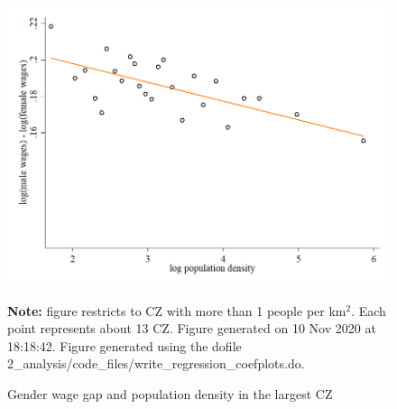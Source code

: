 \begin{figure}[!h]
\centering
\caption{Gender wage gap and population density in the largest CZ}
\includegraphics[width=1\textwidth]{../2_analysis/output/figures/l_czone_density_2020_big_CZ}
\par \begin{minipage}[h]{\textwidth}{\tiny\textbf{Note:} figure restricts to CZ with more than 1 people per km$^2$. Each point represents about 13 CZ. Figure generated on 10 Nov 2020 at 18:18:42. Figure generated using the dofile 2\_analysis/code\_files/write\_regression\_coefplots.do.}\end{minipage}
\end{figure}
